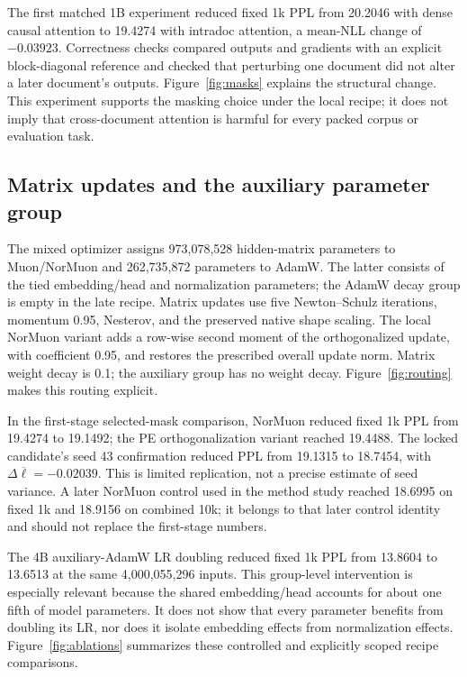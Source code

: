 The first matched 1B experiment reduced fixed 1k PPL from 20.2046 with dense causal attention to 19.4274 with intradoc attention, a mean-NLL change of$-0.03923$. Correctness checks compared outputs and gradients with an explicit block-diagonal reference and checked that perturbing one document did not alter a later document's outputs. Figure~\ref{fig:masks} explains the structural change. This experiment supports the masking choice under the local recipe; it does not imply that cross-document attention is harmful for every packed corpus or evaluation task.


\subsection{Matrix updates and the auxiliary parameter group}

The mixed optimizer assigns 973,078,528 hidden-matrix parameters to Muon/NorMuon and 262,735,872 parameters to AdamW. The latter consists of the tied embedding/head and normalization parameters; the AdamW decay group is empty in the late recipe. Matrix updates use five Newton--Schulz iterations, momentum 0.95, Nesterov, and the preserved native shape scaling. The local NorMuon variant adds a row-wise second moment of the orthogonalized update, with coefficient 0.95, and restores the prescribed overall update norm. Matrix weight decay is 0.1; the auxiliary group has no weight decay. Figure~\ref{fig:routing} makes this routing explicit.

In the first-stage selected-mask comparison, NorMuon reduced fixed 1k PPL from 19.4274 to 19.1492; the PE orthogonalization variant reached 19.4488. The locked candidate's seed 43 confirmation reduced PPL from 19.1315 to 18.7454, with $\Delta\overline{\ell}=-0.02039$. This is limited replication, not a precise estimate of seed variance. A later NorMuon control used in the method study reached 18.6995 on fixed 1k and 18.9156 on combined 10k; it belongs to that later control identity and should not replace the first-stage numbers.

The 4B auxiliary-AdamW LR doubling reduced fixed 1k PPL from 13.8604 to 13.6513 at the same 4,000,055,296 inputs. This group-level intervention is especially relevant because the shared embedding/head accounts for about one fifth of model parameters. It does not show that every parameter benefits from doubling its LR, nor does it isolate embedding effects from normalization effects. Figure~\ref{fig:ablations} summarizes these controlled and explicitly scoped recipe comparisons.

